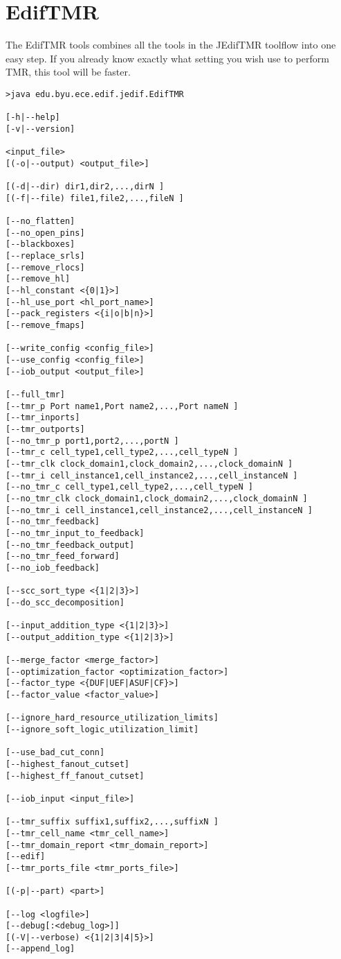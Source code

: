 \section{EdifTMR}
The EdifTMR tools combines all the tools in the JEdifTMR toolflow into
one easy step. If you already know exactly what setting you wish use
to perform TMR, this tool will be faster.

\begin{verbatim}
>java edu.byu.ece.edif.jedif.EdifTMR

[-h|--help]
[-v|--version]

<input_file>
[(-o|--output) <output_file>]

[(-d|--dir) dir1,dir2,...,dirN ]
[(-f|--file) file1,file2,...,fileN ]

[--no_flatten]
[--no_open_pins]
[--blackboxes]
[--replace_srls]
[--remove_rlocs]
[--remove_hl]
[--hl_constant <{0|1}>]
[--hl_use_port <hl_port_name>]
[--pack_registers <{i|o|b|n}>]
[--remove_fmaps]

[--write_config <config_file>]
[--use_config <config_file>]
[--iob_output <output_file>]

[--full_tmr]
[--tmr_p Port name1,Port name2,...,Port nameN ]
[--tmr_inports]
[--tmr_outports]
[--no_tmr_p port1,port2,...,portN ]
[--tmr_c cell_type1,cell_type2,...,cell_typeN ]
[--tmr_clk clock_domain1,clock_domain2,...,clock_domainN ]
[--tmr_i cell_instance1,cell_instance2,...,cell_instanceN ]
[--no_tmr_c cell_type1,cell_type2,...,cell_typeN ]
[--no_tmr_clk clock_domain1,clock_domain2,...,clock_domainN ]
[--no_tmr_i cell_instance1,cell_instance2,...,cell_instanceN ]
[--no_tmr_feedback]
[--no_tmr_input_to_feedback]
[--no_tmr_feedback_output]
[--no_tmr_feed_forward]
[--no_iob_feedback]

[--scc_sort_type <{1|2|3}>]
[--do_scc_decomposition]

[--input_addition_type <{1|2|3}>]
[--output_addition_type <{1|2|3}>]

[--merge_factor <merge_factor>]
[--optimization_factor <optimization_factor>]
[--factor_type <{DUF|UEF|ASUF|CF}>]
[--factor_value <factor_value>]

[--ignore_hard_resource_utilization_limits]
[--ignore_soft_logic_utilization_limit]

[--use_bad_cut_conn]
[--highest_fanout_cutset]
[--highest_ff_fanout_cutset]

[--iob_input <input_file>]

[--tmr_suffix suffix1,suffix2,...,suffixN ]
[--tmr_cell_name <tmr_cell_name>]
[--tmr_domain_report <tmr_domain_report>]
[--edif]
[--tmr_ports_file <tmr_ports_file>]

[(-p|--part) <part>]

[--log <logfile>]
[--debug[:<debug_log>]]
[(-V|--verbose) <{1|2|3|4|5}>]
[--append_log]

\end{verbatim}
